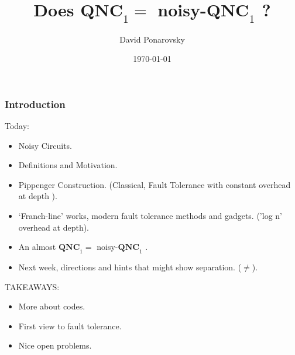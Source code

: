 \documentclass{beamer}
\newcommand*{\QNCon}{ \mathbf{QNC}_{1} }
\newcommand*{\noiseQNCon}{ noisy-$\QNCon$ }
\begin{document}
 

\newcommand*{\Tr}{\textbf{Tr }}


\begin{frame}
  \title{Does $\QNCon =$ \noiseQNCon ? }
    \author{David Ponarovsky}
    \date{\today}
    \titlepage
\end{frame}


\begin{frame}

\frametitle{Introduction}
\begin{block}{Today:}
\begin{itemize}
  \item Noisy Circuits.
  \item  Definitions and Motivation.
  \item  Pippenger Construction. (Classical, Fault Tolerance with constant overhead at depth ).
  \item `Franch-line' works, modern fault tolerance methods and gadgets. ('log n' overhead at depth).  
  \item An almost  $\QNCon =$ \noiseQNCon. 
  \item Next week, directions and hints that might show separation. ($\neq$).
\end{itemize}
\end{block}
\begin{block}{TAKEAWAYS:}
\begin{itemize}
  \item More about codes.
  \item  First view to fault tolerance.  
  \item Nice open problems. 
\end{itemize}
\end{block}
\end{frame}
\end{document}
